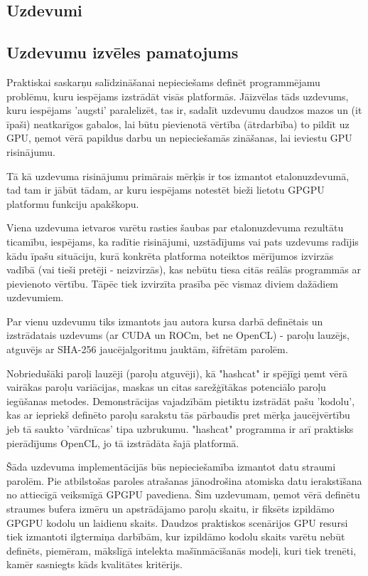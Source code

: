 \begin{center}
    \chapter{Uzdevumi}
\end{center}
\section{Uzdevumu izvēles pamatojums}

Praktiskai saskarņu salīdzināšanai nepieciešams definēt programmējamu problēmu,
kuru iespējams izstrādāt visās platformās.  Jāizvēlas tāds uzdevums, kuru
iespējams 'augsti' paralelizēt, tas ir, sadalīt uzdevumu daudzos mazos un (it
īpaši) neatkarīgos gabalos, lai būtu pievienotā vērtība (ātrdarbība) to pildīt
uz GPU, ņemot vērā papildus darbu un nepieciešamās zināšanas, lai ieviestu GPU
risinājumu.

Tā kā uzdevuma risinājumu primārais mērķis ir tos izmantot etalonuzdevumā, tad
tam ir jābūt tādam, ar kuru iespējams notestēt bieži lietotu GPGPU
platformu funkciju apakškopu.

Viena uzdevuma ietvaros varētu rasties šaubas par etalonuzdevuma rezultātu
ticamību, iespējams, ka radītie risinājumi, uzstādījums vai pats uzdevums
radījis kādu īpašu situāciju, kurā konkrēta platforma noteiktos mērījumos
izvirzās vadībā (vai tieši pretēji - neizvirzās), kas nebūtu tiesa citās reālās
programmās ar pievienoto vērtību. Tāpēc tiek izvirzīta prasība pēc vismaz
diviem dažādiem
uzdevumiem.

Par vienu uzdevumu tiks izmantots jau autora kursa darbā definētais un 
izstrādatais uzdevums (ar CUDA un ROCm, bet ne OpenCL) - paroļu lauzējs,
atguvējs ar SHA-256 jaucējalgoritmu jauktām, šifrētām parolēm.\cite{kursa-darbs}

Nobriedušāki paroļi lauzēji (paroļu atguvēji), kā "hashcat"\cite{hashcat} ir
spējīgi ņemt vērā vairākas paroļu variācijas, maskas un citas sarežģītākas
potenciālo paroļu iegūšanas metodes. Demonstrācijas vajadzībām pietiktu
izstrādāt pašu 'kodolu', kas ar iepriekš definēto paroļu sarakstu tās
pārbaudīs pret mērķa jaucējvērtību jeb tā saukto 'vārdnīcas' tipa
uzbrukumu.\cite{hashcat_dict_atk} "hashcat" programma ir arī praktisks
pierādījums OpenCL, jo tā izstrādāta šajā
platformā. \cite{hashcat}

Šāda uzdevuma implementācijās būs nepieciešamība izmantot datu straumi parolēm.
Pie atbilstošas paroles atrašanas jānodrošina atomiska datu ierakstīšana no
attiecīgā veiksmīgā GPGPU pavediena. Šim uzdevumam, ņemot vērā definētu
straumes bufera izmēru un apstrādājamo paroļu skaitu, ir fiksēts izpildāmo
GPGPU kodolu un laidienu skaits. Daudzos praktiskos scenārijos GPU resursi tiek
izmantoti ilgtermiņa darbībām, kur izpildāmo kodolu skaits varētu nebūt
definēts, piemēram, mākslīgā intelekta mašīnmācīšanās modeļi, kuri tiek trenēti,
kamēr sasniegts kāds kvalitātes kritērijs.

